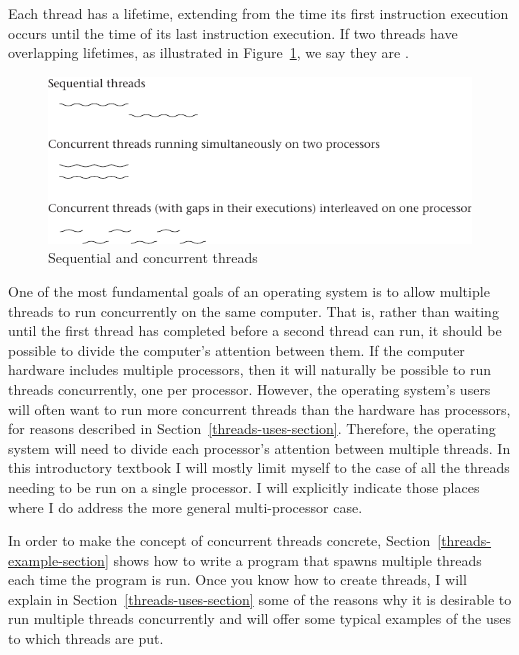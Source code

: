 Each thread has a lifetime, extending from the time its first
instruction execution occurs until the time of its last instruction
execution.  If two threads have overlapping lifetimes, as illustrated
in Figure~\ref{scan-2-2}, we say they are
.
\begin{figure}
\centerline{\includegraphics{hail_f0202}}
\caption{Sequential and concurrent threads}
\label{scan-2-2}
\end{figure}
One of the most fundamental goals of an operating system is to allow
multiple threads to run concurrently on the same computer.  That is,
rather than waiting until the first thread has completed before a
second thread can run, it should be possible to divide the computer's
attention between them.  If the computer hardware includes multiple
processors, then it will naturally be possible to run threads
concurrently, one per processor.  However, the operating system's
users will often want to run more concurrent threads than the hardware
has processors, for reasons described in Section~\ref{threads-uses-section}.  Therefore, the operating
system will need to divide each processor's attention between multiple
threads.  In this introductory textbook I will mostly limit myself
to the case of all the threads needing to be run on a
single processor.  I will explicitly indicate those places where I
do address the more general multi-processor case.

In order to make the concept of concurrent threads concrete,
Section~\ref{threads-example-section} shows how to write a program
that spawns multiple threads each time the program is run.  Once you
know how to create threads, I will explain in
Section~\ref{threads-uses-section} some of the reasons why it is
desirable to run multiple threads concurrently and will offer some
typical examples of the uses to which threads are put.

